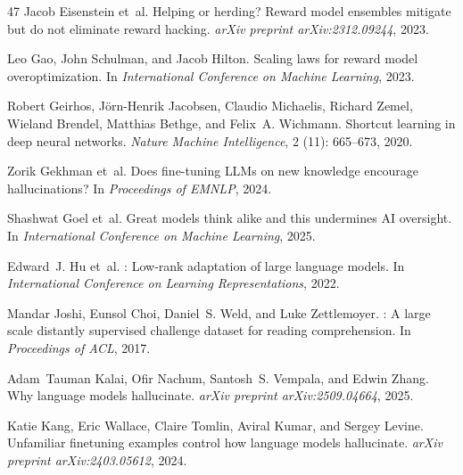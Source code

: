 \documentclass[11pt,a4paper,twocolumn]{article}
\begin{document}
\begin{thebibliography}{47}
Jacob Eisenstein et~al.
\newblock Helping or herding? {R}eward model ensembles mitigate but do not
  eliminate reward hacking.
\newblock \emph{arXiv preprint arXiv:2312.09244}, 2023.

Leo Gao, John Schulman, and Jacob Hilton.
\newblock Scaling laws for reward model overoptimization.
\newblock In \emph{International Conference on Machine Learning}, 2023.

Robert Geirhos, J{\"o}rn-Henrik Jacobsen, Claudio Michaelis, Richard Zemel,
  Wieland Brendel, Matthias Bethge, and Felix~A. Wichmann.
\newblock Shortcut learning in deep neural networks.
\newblock \emph{Nature Machine Intelligence}, 2 (11):
  665--673, 2020.

Zorik Gekhman et~al.
\newblock Does fine-tuning {LLMs} on new knowledge encourage hallucinations?
\newblock In \emph{Proceedings of EMNLP}, 2024.

Shashwat Goel et~al.
\newblock Great models think alike and this undermines {AI} oversight.
\newblock In \emph{International Conference on Machine Learning}, 2025.

Edward~J. Hu et~al.
: Low-rank adaptation of large language models.
\newblock In \emph{International Conference on Learning Representations}, 2022.

Mandar Joshi, Eunsol Choi, Daniel~S. Weld, and Luke Zettlemoyer.
: A large scale distantly supervised challenge dataset for
  reading comprehension.
\newblock In \emph{Proceedings of ACL}, 2017.

Adam~Tauman Kalai, Ofir Nachum, Santosh~S. Vempala, and Edwin Zhang.
\newblock Why language models hallucinate.
\newblock \emph{arXiv preprint arXiv:2509.04664}, 2025.

Katie Kang, Eric Wallace, Claire Tomlin, Aviral Kumar, and Sergey Levine.
\newblock Unfamiliar finetuning examples control how language models
  hallucinate.
\newblock \emph{arXiv preprint arXiv:2403.05612}, 2024.


\end{thebibliography}
\end{document}
